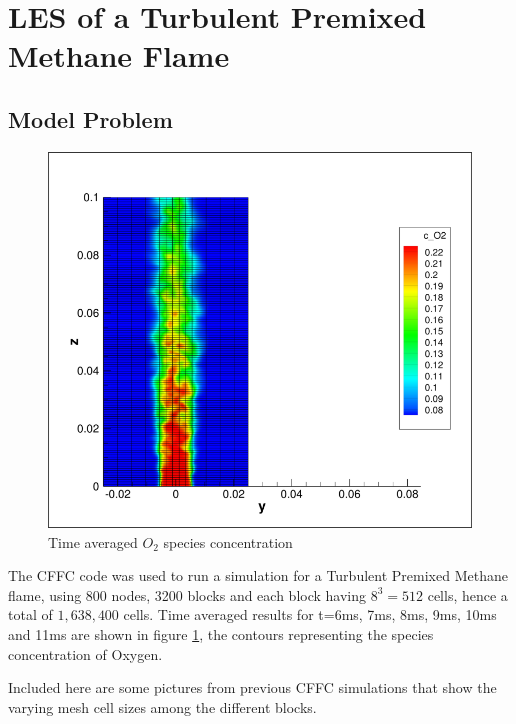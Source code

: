 \section{LES of a Turbulent Premixed Methane Flame}
\subsection{Model Problem}


\begin{figure}
    \vspace{0.2cm}
    \begin{center}
      \includegraphics[height=0.4\textwidth]{./figs/Time_averaged_c_O2.png}
    \end{center}
    \caption{Time averaged $O_2$ species concentration}  
    \vspace{0.2cm}
    \label{fig:oxygen}	
\end{figure}

The CFFC code was used to run a simulation for a Turbulent Premixed Methane flame, using 800 nodes, 3200 blocks and each block having $8^3 = 512$ cells, hence a total of $1,638,400$ cells. Time averaged results for t=6ms, 7ms, 8ms, 9ms, 10ms and 11ms are shown in figure \ref{fig:oxygen}, the contours representing the species concentration of Oxygen.\par


Included here are some pictures from previous CFFC simulations that show the varying mesh cell sizes among the different blocks.

